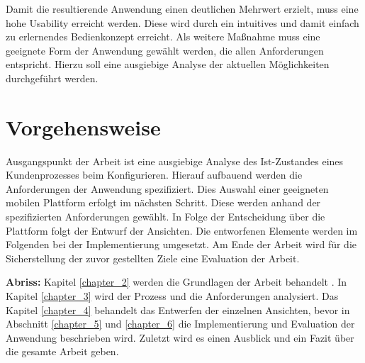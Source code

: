Damit die resultierende Anwendung einen deutlichen Mehrwert erzielt, muss eine hohe Usability erreicht werden. Diese wird durch ein intuitives und damit einfach zu erlernendes Bedienkonzept erreicht. Als weitere Maßnahme muss eine geeignete Form der Anwendung gewählt werden, die allen Anforderungen entspricht. Hierzu soll eine ausgiebige Analyse der aktuellen Möglichkeiten durchgeführt werden.

\section{Vorgehensweise}
Ausgangspunkt der Arbeit ist eine ausgiebige Analyse des Ist-Zustandes eines Kundenprozesses beim Konfigurieren. Hierauf aufbauend werden die Anforderungen der Anwendung spezifiziert. Dies Auswahl einer geeigneten mobilen Plattform erfolgt im nächsten Schritt. Diese werden anhand der spezifizierten Anforderungen gewählt. In Folge der Entscheidung über die Plattform folgt der Entwurf der Ansichten. Die entworfenen Elemente werden im Folgenden bei der Implementierung umgesetzt. Am Ende der Arbeit wird für die Sicherstellung der zuvor gestellten Ziele eine Evaluation der Arbeit. 
\par
\textbf{Abriss: }
Kapitel \ref{chapter_2} werden die Grundlagen der Arbeit behandelt . In Kapitel \ref{chapter_3} wird der Prozess und die Anforderungen analysiert. Das Kapitel \ref{chapter_4} behandelt das Entwerfen der einzelnen Ansichten, bevor in Abschnitt \ref{chapter_5} und \ref{chapter_6} die Implementierung und Evaluation der Anwendung beschrieben wird. Zuletzt wird es einen Ausblick und ein Fazit über die gesamte Arbeit geben.







